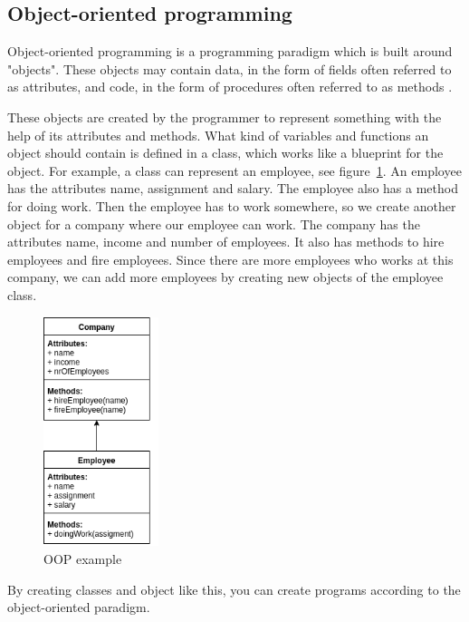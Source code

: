 \documentclass {article}
\begin{document}
\subsection{Object-oriented programming}
Object-oriented programming is a programming paradigm which is built around "objects". These objects may contain data, in the form of fields often referred to as attributes, and code, in the form of procedures often referred to as methods \cite{kindler}.

These objects are created by the programmer to represent something with the help of its attributes and methods. What kind of variables and functions an object should contain is defined in a class, which works like a blueprint for the object. For example, a class can represent an employee, see figure~\ref{fig:oop-example}. An employee has the attributes name, assignment and salary. The employee also has a method for doing work. Then the employee has to work somewhere, so we create another object for a company where our employee can work. The company has the attributes name, income and number of employees. It also has methods to hire employees and fire employees. Since there are more employees who works at this company, we can add more employees by creating new objects of the employee class.

\begin{figure}[H]
\centering
\includegraphics[width=0.3\textwidth]{oop-example}

\caption {OOP example}
\label{fig:oop-example}
\end {figure}

By creating classes and object like this, you can create programs according to the object-oriented paradigm.
\end{document}
